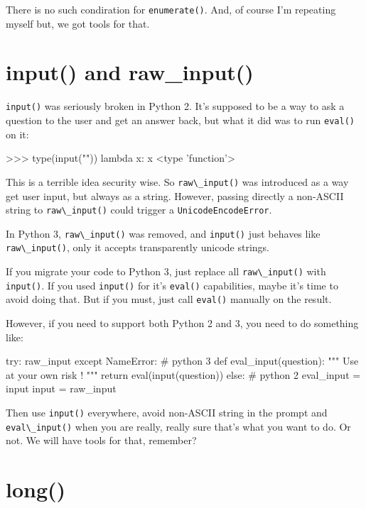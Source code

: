 There is no such condiration for \lstinline{enumerate()}. And, of course I'm repeating myself but, we got tools for that.

\section{input() and raw\_input()}

\lstinline{input()} was seriously broken in Python 2. It's supposed to be a way to ask a question to the user and get an answer back, but what it did was to run \lstinline{eval()} on it:

\begin{py2}
>>> type(input(""))
lambda x: x
<type 'function'>
\end{py2}

This is a terrible idea security wise. So \lstinline{raw\_input()} was introduced as a way get user input, but always as a string. However, passing directly a non-ASCII string to \lstinline{raw\_input()} could trigger a \lstinline{UnicodeEncodeError}.

In Python 3, \lstinline{raw\_input()} was removed, and \lstinline{input()} just behaves like \lstinline{raw\_input()}, only it accepts transparently unicode strings.

If you migrate your code to Python 3, just replace all \lstinline{raw\_input()} with \lstinline{input()}. If you used \lstinline{input()} for it's \lstinline{eval()} capabilities, maybe it's time to avoid doing that. But if you must, just call \lstinline{eval()} manually on the result.

However, if you need to support both Python 2 and 3, you need to do something like:

\begin{py2and3}
try:
    raw\_input
except NameError: # python 3
    def eval_input(question):
        """ Use at your own risk ! """
        return eval(input(question))
else: # python 2
    eval_input = input
    input = raw\_input
\end{py2and3}

Then use \lstinline{input()} everywhere, avoid non-ASCII string in the prompt and \lstinline{eval\_input()} when you are really, really sure that's what you want to do. Or not. We will have tools for that, remember?

\section{long()}


